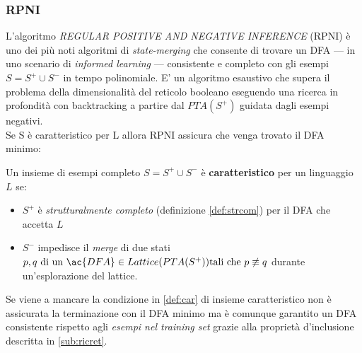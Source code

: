 \subsubsection{RPNI}
L'algoritmo \textit{ REGULAR POSITIVE  AND NEGATIVE INFERENCE} (RPNI) \cite{Oncina92} è uno dei più noti algoritmi di \textit{state-merging} che consente di trovare un \ac{DFA} --- in uno scenario di \textit{informed learning} --- consistente e completo con gli esempi $S = S^{+} \cup S^{-}$ in tempo polinomiale. E' un algoritmo esaustivo  che supera il problema della dimensionalità del reticolo booleano eseguendo una ricerca in profondità con backtracking a partire dal $PTA(S^{+})$ guidata dagli esempi negativi.\\
Se S è caratteristico per \ac{L} allora RPNI assicura che venga trovato il \ac{DFA} minimo:
\begin{definizione}
\label{def:car}
 Un insieme di esempi completo $S = S^{+} \cup S^{-}$ è \textbf{caratteristico} per un linguaggio $L$ se:
\begin{itemize}
\item $S^{+}$ è \textit{strutturalmente completo} (definizione \ref{def:strcom})  per il \ac{DFA} che accetta $L$
\item  $S^{-}$ impedisce il \textit{merge} di due stati $p,q \text{ di un } \ac{DFA} \in Lattice(PTA(S^{+})) \text{tali che } p \not\equiv q$ durante un'esplorazione del lattice.
\end{itemize}
\end{definizione}
Se viene a mancare la condizione in \ref{def:car} di insieme caratteristico non è assicurata la terminazione con il \ac{DFA} minimo ma è comunque garantito un \ac{DFA} consistente rispetto agli \textit{esempi nel training set} grazie alla proprietà d'inclusione descritta  in \ref{sub:ricret}.


